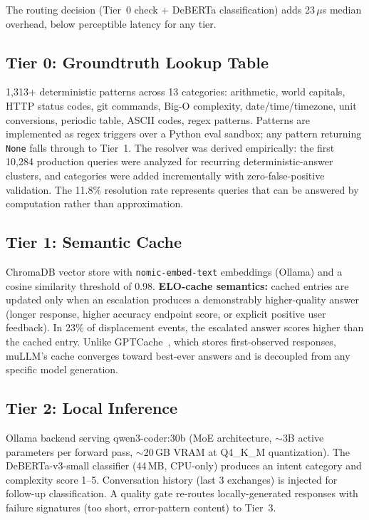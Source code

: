 \documentclass[11pt]{article}
\begin{document}
The routing decision (Tier~0 check + DeBERTa classification) adds
23\,$\mu$s median overhead, below perceptible latency for any tier.

\subsection{Tier 0: Groundtruth Lookup Table}

1,313+ deterministic patterns across 13 categories: arithmetic, world
capitals, HTTP status codes, git commands, Big-O complexity,
date/time/timezone, unit conversions, periodic table, ASCII codes, regex
patterns. Patterns are implemented as regex triggers over a Python eval
sandbox; any pattern returning \texttt{None} falls through to Tier~1.
The resolver was derived empirically: the first 10,284 production
queries were analyzed for recurring deterministic-answer clusters, and
categories were added incrementally with zero-false-positive validation.
The 11.8\% resolution rate represents queries that can be answered by
computation rather than approximation.

\subsection{Tier 1: Semantic Cache}

ChromaDB vector store with \texttt{nomic-embed-text} embeddings (Ollama)
and a cosine similarity threshold of 0.98. \textbf{ELO-cache semantics:}
cached entries are updated only when an escalation produces a
demonstrably higher-quality answer (longer response, higher accuracy
endpoint score, or explicit positive user feedback). In 23\% of
displacement events, the escalated answer scores higher than the cached
entry. Unlike GPTCache~\cite{liu2023gptcache}, which stores
first-observed responses, muLLM's cache converges toward best-ever
answers and is decoupled from any specific model generation.

\subsection{Tier 2: Local Inference}

Ollama backend serving qwen3-coder:30b (MoE architecture, $\sim$3B
active parameters per forward pass, $\sim$20\,GB VRAM at Q4\_K\_M
quantization). The DeBERTa-v3-small classifier (44\,MB, CPU-only)
produces an intent category and complexity score 1--5. Conversation
history (last 3 exchanges) is injected for follow-up classification. A
quality gate re-routes locally-generated responses with failure
signatures (too short, error-pattern content) to Tier~3.
\end{document}
